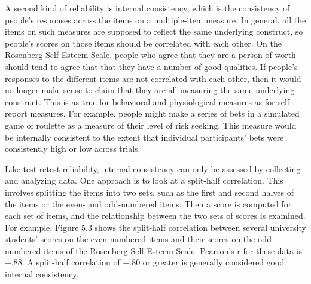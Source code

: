 A second kind of reliability is internal consistency, which is the consistency of people's responses across the items on a multiple-item measure. In general, all the items on such measures are supposed to reflect the same underlying construct, so people's scores on those items should be correlated with each other. On the Rosenberg Self-Esteem Scale, people who agree that they are a person of worth should tend to agree that that they have a number of good qualities. If people's responses to the different items are not correlated with each other, then it would no longer make sense to claim that they are all measuring the same underlying construct. This is as true for behavioral and physiological measures as for self-report measures. For example, people might make a series of bets in a simulated game of roulette as a measure of their level of risk seeking. This measure would be internally consistent to the extent that individual participants' bets were consistently high or low across trials.

Like test-retest reliability, internal consistency can only be assessed by collecting and analyzing data. One approach is to look at a split-half correlation. This involves splitting the items into two sets, such as the first and second halves of the items or the even- and odd-numbered items. Then a score is computed for each set of items, and the relationship between the two sets of scores is examined. For example, Figure 5.3 shows the split-half correlation between several university students' scores on the even-numbered items and their scores on the odd-numbered items of the Rosenberg Self-Esteem Scale. Pearson's r for these data is +.88. A split-half correlation of +.80 or greater is generally considered good internal consistency.


